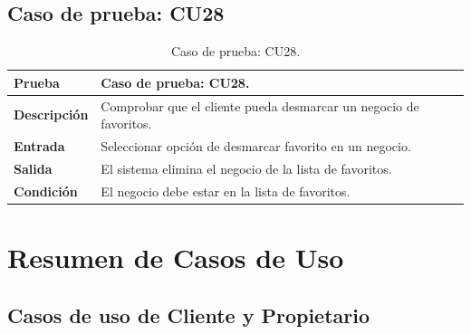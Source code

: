 
\subsection{Caso de prueba: CU28}

\begin{table}[ht]
\centering
\renewcommand{\arraystretch}{1.3}
\begin{tabular}{|p{3cm}|p{12cm}|}
\hline
\rowcolor[RGB]{191,191,191}
\textbf{Prueba} & Caso de prueba: CU28. \\
\hline
\textbf{Descripción} \cellcolor[RGB]{217,217,217} & Comprobar que el cliente pueda desmarcar un negocio de favoritos. \\
\hline
\textbf{Entrada} \cellcolor[RGB]{217,217,217} & Seleccionar opción de desmarcar favorito en un negocio. \\
\hline
\textbf{Salida} \cellcolor[RGB]{217,217,217} & El sistema elimina el negocio de la lista de favoritos. \\
\hline
\textbf{Condición} \cellcolor[RGB]{217,217,217} & El negocio debe estar en la lista de favoritos. \\
\hline
\end{tabular}
\caption{Caso de prueba: CU28.}
\label{tab:cu28_black_test}
\end{table}

\newpage


\section{Resumen de Casos de Uso}

\subsection{Casos de uso de Cliente y Propietario}

